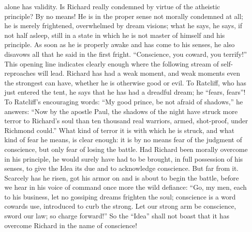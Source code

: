 \documentclass[12pt,a4paper,openany]{book}
\newcommand{\opage}[1]{\marginnote{\footnotesize\textit{[#1]}}}
\begin{document}
alone has validity. Is Richard really condemned by virtue
of the atheistic principle? By no means! He is in the proper
sense not morally condemned at all; he is merely frightened,
overwhelmed by dream visions; what he says, he says, if
not half asleep, still in a state in which he is not
master of himself and his principle. As soon as he is properly
awake and has come to his senses, he also disavows
all that he said in the first fright. ``Conscience,
you coward, you terrify!'' This
\setcounter{footnote}{0}%
\opage{547}opening line indicates clearly enough where the following stream of
self-reproaches will lead. Richard has had a weak
moment, and weak moments even the strongest can have,
whether he is otherwise good or evil. To Ratcliff, who
has just entered the tent, he says that he has had
a dreadful dream; he ``fears, fears''! To Ratcliff's
encouraging words: ``My good prince, be not afraid of
shadows,'' he answers: ``Now by the apostle Paul, the shadows
of the night have struck more terror to Richard's soul
than ten thousand real warriors, armed,
shot-proof, under Richmond could.'' What kind of
terror it is with which he is struck, and what kind of
fear he means, is clear enough: it is by no means fear
of the judgment of conscience, but only fear of losing
the battle. Had Richard been morally overcome in his principle,
he would surely have had to be brought, in full possession of his senses,
to give the Idea its due and to acknowledge conscience. But
far from it. Scarcely has he risen, got his armor
on and is about to begin the battle, before we hear in his voice of command
once more the wild defiance: ``Go, my men,
each to his business, let no gossiping dreams
frighten the soul; conscience is a word cowards use,
introduced to curb the strong. Let our strong arm be
conscience, sword our law; so charge forward!'' So
the ``Idea'' shall not boast that it
has overcome Richard in the name of conscience!
\end{document}
